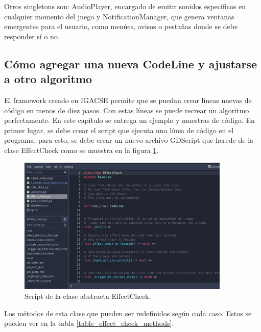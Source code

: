 Otros singletons son: AudioPlayer, encargado de emitir sonidos específicos en cualquier momento del juego y NotificationManager, que genera ventanas emergentes para el usuario, como menúes, avisos o pestañas donde se debe responder sí o no.

\subsection{Cómo agregar una nueva CodeLine y ajustarse a otro algoritmo}

El framework creado en IGACSE permite que se puedan crear líneas nuevas de código en menos de diez pasos. Con estas líneas se puede recrear un algoritmo perfectamente. En este capítulo se entrega un ejemplo y muestras de código. En primer lugar, se debe crear el script que ejecuta una línea de código en el programa, para esto, se debe crear un nuevo archivo GDScript que herede de la clase EffectCheck como se muestra en la figura \ref{effect_check_script}.

\begin{figure}[h!]
	\centering
	\includegraphics[width=0.9\textwidth]{imagenes/effect_check_script.png}
	\caption{Script de la clase abstracta EffectCheck.}
	\label{effect_check_script}
\end{figure}


Los métodos de esta clase que pueden ser redefinidos según cada caso. Estos se pueden ver en la tabla \ref{table_effect_check_methods}. 


